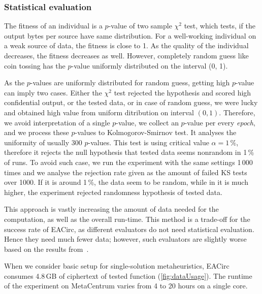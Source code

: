 \documentclass[
  print, %
  Table,   %
  nolof,     %
  nolot,     %
  11pt, %
  oneside  %
]{fithesis3}
\begin{document}
\subsubsection{Statistical evaluation}
\label{subsubsec:method-spec-ss-stat}

The fitness of an individual is a $p$-value of two sample $\chi^{2}$ test, which tests, if the output bytes per source have same distribution. For a well-working individual on a weak source of data, the fitness is close to 1. As the quality of the individual decreases, the fitness decreases as well. However, completely random guess like coin tossing has the $p$-value uniformly distributed on the interval (0, 1).

As the $p$-values are uniformly distributed for random guess, getting high $p$-value can imply two cases. Either the $\chi^{2}$ test rejected the hypothesis and scored high confidential output, or the tested data, or in case of random guess, we were lucky and obtained high value from uniform ditribution on interval $(0, 1)$. Therefore, we avoid interpretation of a single $p$-value, we collect an $p$-value per every \textit{epoch}, and we process these $p$-values to Kolmogorov-Smirnov test. It analyses the uniformity of usually 300 $p$-values. This test is using critical value $\alpha = 1\,\%$, therefore it rejects the null hypothesis that tested data seems nonrandom in 1\,\% of runs. To avoid such case, we run the experiment with the same settings 1\,000 times and we analyse the rejection rate given as the amount of failed KS tests over 1000. If it is around 1\,\%, the data seem to be random, while in it is much higher, the experiment rejected randomness hypothesis of tested data.

This approach is vastly increasing the amount of data needed for the computation, as well as the overall run-time. This method is a trade-off for the success rate of EACirc, as different evaluators do not need statistical evaluation. Hence they need much fewer data; however, such evaluators are slightly worse based on the results from~\cite{svenda2013towards}.

When we consider basic setup for single-solution metaheuristics, EACirc consumes 4.8\,GB of ciphertext of tested function (\cref{fig:dataUsage}). The runtime of the experiment on MetaCentrum varies from 4 to 20 hours on a single core.
\end{document}
